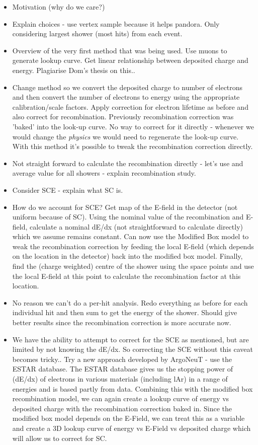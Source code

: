\begin{itemize}
	\item Motivation (why do we care?)
	\item Explain choices - use vertex sample because it helps pandora. Only considering largest shower (most hits) from each event. 
	\item Overview of the very first method that was being used. Use muons to generate lookup curve. Get linear relationship between deposited charge and energy. Plagiarise Dom's thesis on this..  
	\item Change method so we convert the deposited charge to number of electrons and then convert the number of electrons to energy using the appropriate calibration/scale factors. Apply correction for electron lifetime as before and also correct for recombination. Previously recombination correction was 'baked' into the look-up curve. No way to correct for it directly - whenever we would change the \textit{physics} we would need to regenerate the look-up curve. With this method it's possible to tweak the recombination correction directly. 
	\item Not straight forward to calculate the recombination directly - let's use and average value for all showers - explain recombination study. 
	\item Consider SCE - explain what SC is.
	\item How do we account for SCE? Get map of the E-field in the detector (not uniform because of SC). Using the nominal value of the recombination and E-field, calculate a nominal dE/dx (not straightforward to calculate directly) which we assume remains constant. Can now use the Modified Box model to weak the recombination correction by feeding the local E-field (which depends on the location in the detector) back into the modified box model. Finally, find the (charge weighted) centre of the shower using the space points and use the local E-field at this point to calculate the recombination factor at this location. 
	\item No reason we can't do a per-hit analysis. Redo everything as before for each individual hit and then sum to get the energy of the shower. Should give better results since the recombination correction is more accurate now. 
	\item We have the ability to attempt to correct for the SCE as mentioned, but are limited by not knowing the dE/dx. So correcting the SCE without this caveat becomes tricky.. Try a new approach developed by ArgoNeuT - use the ESTAR database. The ESTAR database gives us the stopping power of (dE/dx) of electrons in various materials (including lAr) in a range of energies and is based partly from data. Combining this with the modified box recombination model, we can again create a lookup curve of energy vs deposited charge with the recombination correction baked in. Since the modified box model depends on the E-Field, we can treat this as a variable and create a 3D lookup curve of energy vs E-Field vs deposited charge which will allow us to correct for SC. 

\end{itemize}

